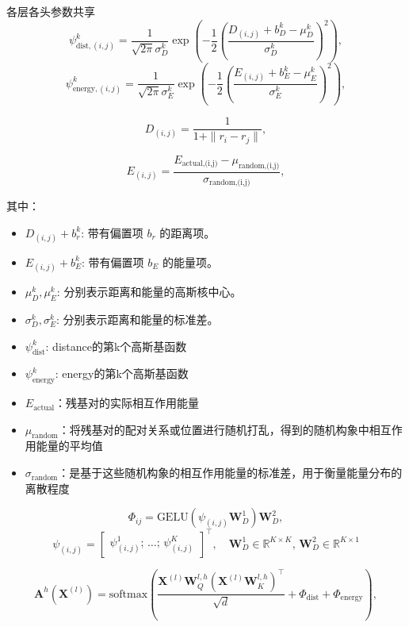 
各层各头参数共享
\[
\psi_{\text{dist},(i,j)}^{k} = \frac{1}{\sqrt{2\pi} \sigma_D^k} 
\exp\left( 
-\frac{1}{2} \left( \frac{D_{(i,j)} + b_D^k  - \mu_D^k}{\sigma_D^k} \right)^2
\right),\tag{1}
\]
\[
\psi_{\text{energy},(i,j)}^{k} = \frac{1}{\sqrt{2\pi} \sigma_E^k} 
\exp\left( 
-\frac{1}{2} \left( \frac{E_{(i,j)} + b_E^k - \mu_E^k}{\sigma_E^k} \right)^2
\right),\tag{2}
\]


\[
D_{(i,j)} = \frac{1}{1 + \|r_i - r_j\|},\tag{3}
\]

\[
E_{(i,j)} = \frac{E_{\text{actual,{(i,j)}}} - \mu_{\text{random,{(i,j)}}}}{\sigma_{\text{random,{(i,j)}}}},\tag{4}
\]

其中：
\begin{itemize}
    \item \(D_{(i,j)} + b_r^k\): 带有偏置项 \(b_r\) 的距离项。
    \item \(E_{(i,j)} + b_E^k\): 带有偏置项 \(b_E\) 的能量项。
    \item \(\mu_D^k, \mu_E^k\): 分别表示距离和能量的高斯核中心。
    \item \(\sigma_D^k, \sigma_E^k\): 分别表示距离和能量的标准差。
    \item \(\psi_{\text{dist}}^k\): distance的第k个高斯基函数
    \item     \(\psi_{\text{energy}}^k\): energy的第k个高斯基函数
    \item     \( E_{\text{actual}} \)：残基对的实际相互作用能量
    \item \( \mu_{\text{random}} \)：将残基对的配对关系或位置进行随机打乱，得到的随机构象中相互作用能量的平均值 
    \item \( \sigma_{\text{random}} \)：是基于这些随机构象的相互作用能量的标准差，用于衡量能量分布的离散程度
\end{itemize}


\[
\Phi_{ij} = \text{GELU} \left( \psi_{(i,j)}^{} \mathbf{W}_D^1 \right) \mathbf{W}_D^2,\tag{5}
\]
\[
\psi_{(i,j)} = 
\begin{bmatrix}
\psi_{(i,j)}^1 ; \, \dots ; \, \psi_{(i,j)}^K
\end{bmatrix}^\top, \quad
\mathbf{W}_D^1 \in \mathbb{R}^{K \times K}, \, \mathbf{W}_D^2 \in \mathbb{R}^{K \times 1}
\]

\[
\mathbf{A}^h(\mathbf{X}^{(l)}) = \text{softmax} \left(
\frac{\mathbf{X}^{(l)} \mathbf{W}_Q^{l,h} \left( \mathbf{X}^{(l)} \mathbf{W}_K^{l,h} \right)^\top}{\sqrt{d}} +\Phi_{\text{dist}}+\Phi_{\text{energy}}
\right), \tag{6}
\]

